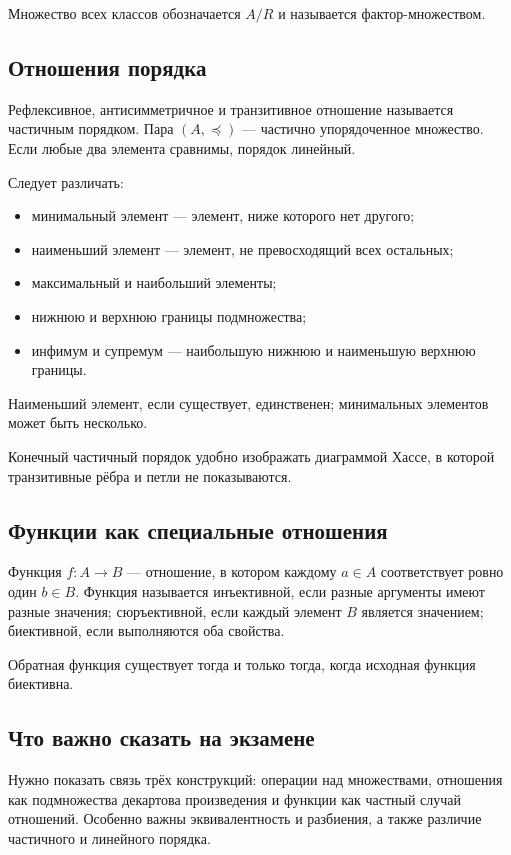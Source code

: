 Множество всех классов обозначается $A/R$ и называется фактор-множеством.

\subsection{Отношения порядка}

Рефлексивное, антисимметричное и транзитивное отношение называется частичным
порядком. Пара $(A,\preceq)$ --- частично упорядоченное множество.
Если любые два элемента сравнимы, порядок линейный.

Следует различать:
\begin{itemize}
    \item минимальный элемент --- элемент, ниже которого нет другого;
    \item наименьший элемент --- элемент, не превосходящий всех остальных;
    \item максимальный и наибольший элементы;
    \item нижнюю и верхнюю границы подмножества;
    \item инфимум и супремум --- наибольшую нижнюю и наименьшую верхнюю границы.
\end{itemize}
Наименьший элемент, если существует, единственен; минимальных элементов может
быть несколько.

Конечный частичный порядок удобно изображать диаграммой Хассе, в которой
транзитивные рёбра и петли не показываются.

\subsection{Функции как специальные отношения}

Функция $f\colon A\to B$ --- отношение, в котором каждому $a\in A$ соответствует
ровно один $b\in B$. Функция называется инъективной, если разные аргументы имеют
разные значения; сюръективной, если каждый элемент $B$ является значением;
биективной, если выполняются оба свойства.

Обратная функция существует тогда и только тогда, когда исходная функция
биективна.

\subsection{Что важно сказать на экзамене}

Нужно показать связь трёх конструкций: операции над множествами, отношения как
подмножества декартова произведения и функции как частный случай отношений.
Особенно важны эквивалентность и разбиения, а также различие частичного и
линейного порядка.

\newpage